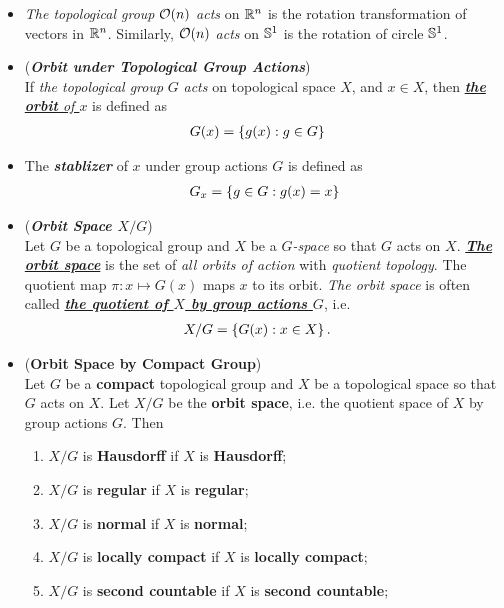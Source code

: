 \documentclass[11pt]{article}
\begin{document}
\begin{itemize}
\item \begin{example}
\emph{The topological group} ${\mathcal O}(n)$ \emph{acts} on ${\mathbb R}^n$ is the rotation transformation of vectors in ${\mathbb R}^n$. Similarly, ${\mathcal O}(n)$ \emph{acts} on ${\mathbb S}^1$ is the rotation of circle ${\mathbb S}^1$.
\end{example}

\item \begin{definition}(\emph{\textbf{Orbit under Topological Group Actions}})\\
If \emph{the topological group} $G$ \emph{acts} on topological space $X$, and $x \in X$, then \underline{\emph{\textbf{the orbit} of $x$}} is defined as
\begin{align*}
G(x) &= \left\{g(x): g\in G\right\}
\end{align*}
\end{definition}

\item \begin{definition}
The \emph{\textbf{stablizer}} of $x$ under group actions $G$ is defined as 
\begin{align*}
G_x = \left\{g\in G: g(x) = x\right\}
\end{align*}
\end{definition}

\item \begin{definition} (\emph{\textbf{Orbit Space $X/G$}})\\
Let $G$ be a topological group and $X$ be a \emph{$G$-space} so that $G$ acts on $X$. \underline{\emph{\textbf{The orbit space}}} is the set of \emph{all orbits of action} with \emph{quotient topology}. The quotient map $\pi: x \mapsto G(x)$ maps $x$ to its orbit. \emph{The orbit space} is often called \underline{\emph{\textbf{the quotient of $X$ by group actions $G$}}}, i.e. 
\begin{align*}
X/G &= \left\{G(x): x \in X\right\}.
\end{align*}
\end{definition}

\item \begin{proposition} (\textbf{Orbit Space by Compact Group})\\
Let $G$ be a \textbf{compact} topological group and $X$ be a topological space so that $G$ acts on $X$. Let $X/G$ be the \textbf{orbit space}, i.e. the quotient space of $X$ by group actions $G$. Then
\begin{enumerate}
\item $X/G$ is \textbf{Hausdorff} if $X$ is \textbf{Hausdorff};
\item $X/G$ is \textbf{regular} if $X$ is \textbf{regular};
\item $X/G$ is \textbf{normal} if $X$ is \textbf{normal};
\item $X/G$ is \textbf{locally compact} if $X$ is \textbf{locally compact};
\item $X/G$ is \textbf{second countable} if $X$ is \textbf{second countable};
\end{enumerate}
\end{proposition}


\end{itemize}
\end{document}
